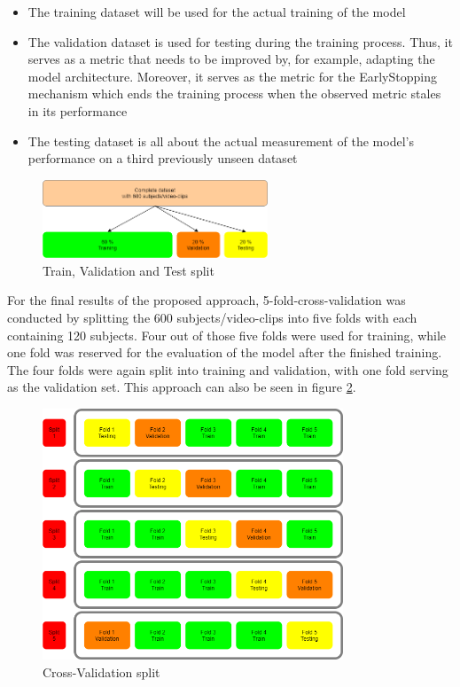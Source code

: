 \begin{itemize}
    \item The training dataset will be used for the actual training of the model
    \item The validation dataset is used for testing during the training process. Thus, it serves as a metric that needs to be improved by, for example, adapting the model architecture. Moreover, it serves as the metric for the EarlyStopping mechanism which ends the training process when the observed metric stales in its performance
    \item The testing dataset is all about the actual measurement of the model's performance on a third previously unseen dataset
\end{itemize}

\begin{figure}[H]
  \begin{center}
  \includegraphics[angle=0, width=0.6\textwidth]{Figures/TrainTest_Split.png}
  \caption{Train, Validation and Test split}
  \label{fig:TrainTestSplit}
  \end{center}
\end{figure}

For the final results of the proposed approach, 5-fold-cross-validation was conducted by splitting the 600 subjects/video-clips into five folds with each containing 120 subjects. Four out of those five folds were used for training, while one fold was reserved for the evaluation of the model after the finished training. The four folds were again split into training and validation, with one fold serving as the validation set. This approach can also be seen in figure \ref{fig:CrossValidationSplit}.

\begin{figure}[H]
  \begin{center}
  \includegraphics[angle=0, width=0.8\textwidth]{Figures/CrossValidation_Split.png}
  \caption{Cross-Validation split}
  \label{fig:CrossValidationSplit}
  \end{center}
\end{figure}

